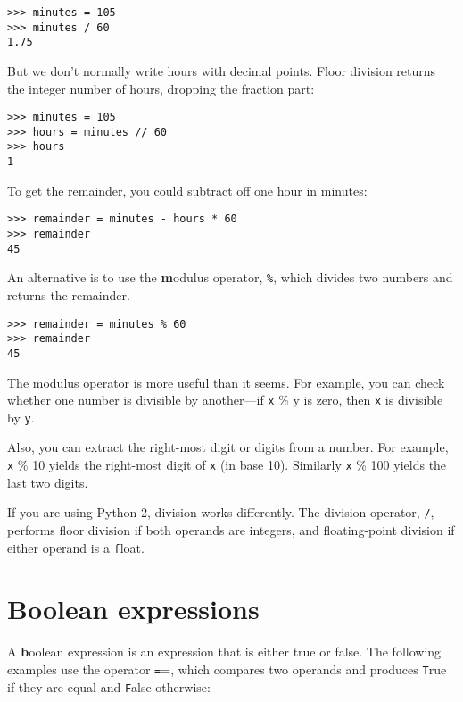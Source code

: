 \documentclass[
DIV=11,
fontsize=13,
twoside,
headinclude=false,
titlepage=firstiscover,
abstract=true,
headsepline=true,
footsepline=true,
chapterprefix=true, %
headings=big,
bibliography=totoc,%
captions=tableheading
]{scrbook}
\theoremstyle{definition}
\begin{document}
\begin{lstlisting}
>>> minutes = 105
>>> minutes / 60
1.75
\end{lstlisting}

But we don't normally write hours with decimal points.  Floor
division returns the integer number of hours, dropping the
fraction part:

\begin{lstlisting}
>>> minutes = 105
>>> hours = minutes // 60
>>> hours
1
\end{lstlisting}

To get the remainder, you could subtract off one hour in minutes:

\begin{lstlisting}
>>> remainder = minutes - hours * 60
>>> remainder
45
\end{lstlisting}


An alternative is to use the {\textbf modulus operator}, \verb"%", which
divides two numbers and returns the remainder.

\begin{lstlisting}
>>> remainder = minutes % 60
>>> remainder
45
\end{lstlisting}
%
The modulus operator is more useful than it seems.  For
example, you can check whether one number is divisible by another---if
{\texttt x \% y} is zero, then {\texttt x} is divisible by {\texttt y}.

Also, you can extract the right-most digit
or digits from a number.  For example, {\texttt x \% 10} yields the
right-most digit of {\texttt x} (in base 10).  Similarly {\texttt x \% 100}
yields the last two digits.

If you are using Python 2, division works differently.  The
division operator, \verb"/", performs floor division if both
operands are integers, and floating-point division if either
operand is a {\texttt float}.


\section{Boolean expressions}

A {\textbf boolean expression} is an expression that is either true
or false.  The following examples use the 
operator {\texttt ==}, which compares two operands and produces
{\texttt True} if they are equal and {\texttt False} otherwise:
\end{document}
